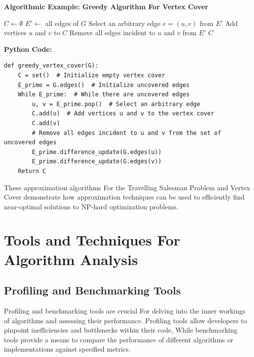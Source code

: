 \documentclass[12pt]{book} %
\begin{document}
\textbf{Algorithmic Example: Greedy Algorithm For Vertex Cover}

\begin{algorithm}
\caption{Greedy Algorithm For Vertex Cover}
\begin{algorithmic}[1]
    \State $C \gets \emptyset$ 
    \State $E' \gets$ all edges of $G$ 
        \State Select an arbitrary edge $e = (u, v)$ from $E'$
        \State Add vertices $u$ and $v$ to $C$
        \State Remove all edges incident to $u$ and $v$ from $E'$
    \EndWhile
    \State \Return $C$
\EndFunction
\end{algorithmic}
\end{algorithm}
\textbf{Python Code:}
\FloatBarrier
\begin{verbatim}
def greedy_vertex_cover(G):
    C = set()  # Initialize empty vertex cover
    E_prime = G.edges()  # Initialize uncovered edges
    While E_prime:  # While there are uncovered edges
        u, v = E_prime.pop()  # Select an arbitrary edge
        C.add(u)  # Add vertices u and v to the vertex cover
        C.add(v)
        # Remove all edges incident to u and v from the set of uncovered edges
        E_prime.difference_update(G.edges(u))
        E_prime.difference_update(G.edges(v))
    Return C
\end{verbatim}
\FloatBarrier
These approximation algorithms For the Travelling Salesman Problem and Vertex Cover demonstrate how approximation techniques can be used to efficiently find near-optimal solutions to NP-hard optimization problems.


\section{Tools and Techniques For Algorithm Analysis}
\subsection{Profiling and Benchmarking Tools}

Profiling and benchmarking tools are crucial For delving into the inner workings of algorithms and assessing their performance. Profiling tools allow developers to pinpoint inefficiencies and bottlenecks within their code, While benchmarking tools provide a means to compare the performance of different algorithms or implementations against specified metrics.
\end{document}
